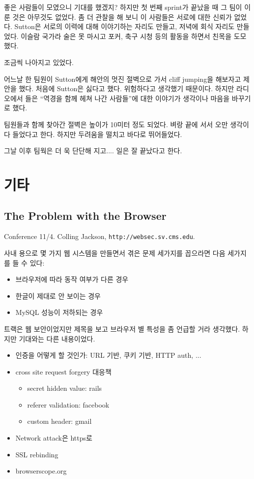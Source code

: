 \documentclass[11pt]{article}
\begin{document}
좋은 사람들이 모였으니 기대를 했겠지? 하지만 첫 번째 sprint가 끝났을 때
그 팀이 이룬 것은 아무것도 없었다. 좀 더 관찰을 해 보니 이 사람들은
서로에 대한 신뢰가 없었다. Sutton은 서로의 이력에 대해 이야기하는
자리도 만들고, 저녁에 회식 자리도 만들었다. 이슬람 국가라 술은 못
마시고 포커, 축구 시청 등의 활동을 하면서 친목을 도모했다.
 
조금씩 나아지고 있었다.
 
어느날 한 팀원이 Sutton에게 해안의 멋진 절벽으로 가서 cliff jumping을
해보자고 제안을 했다. 처음에 Sutton은 싫다고 했다. 위험하다고 생각했기
때문이다.  하지만 라디오에서 들은 ``역경을 함께 헤쳐 나간 사람들''에 대한
이야기가 생각이나 마음을 바꾸기로 했다.
 
팀원들과 함께 찾아간 절벽은 높이가 10미터 정도 되었다. 벼랑 끝에 서서
오만 생각이 다 들었다고 한다. 하지만 두려움을 떨치고 바다로
뛰어들었다.
 
그날 이후 팀웍은 더 욱 단단해 지고.... 일은 잘 끝났다고 한다.
 
\section{기타}

\subsection{The Problem with the Browser}

Conference 11/4. Colling Jackson, \texttt{http://websec.sv.cms.edu}.
 
사내 용으로 몇 가지 웹 시스템을 만들면서 겪은 문제 세가지를 꼽으라면 다음 
세가지를 들 수 있다:
\begin{itemize}
\item 브라우저에 따라 동작 여부가 다른 경우
\item 한글이 제대로 안 보이는 경우
\item MySQL 성능이 저하되는 경우
\end{itemize}
 
트랙은 웹 보안이었지만 제목을 보고 브라우저 별 특성을 좀 언급할 거라 생각했다.
하지만 기대와는 다른 내용이었다.
 
\begin{itemize}
\item 인증을 어떻게 할 것인가: URL 기반, 쿠키 기반, HTTP auth, ...
\item cross site request forgery 대응책
    \begin{itemize}
    \item secret hidden value: rails
    \item referer validation: facebook
    \item custom header: gmail
    \end{itemize}
\item Network  attack은 https로 
\item SSL rebinding
\item browserscope.org 
\end{itemize}
 
\end{document}
